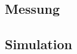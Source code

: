 %
\subsection{Messung}
\label{subsec:3_Messung}
%
%

%
%
%
%
%
%
%
\subsection{Simulation}
\label{subsec:3_Simulation}
%
%

%
%
%
%
%
%
%